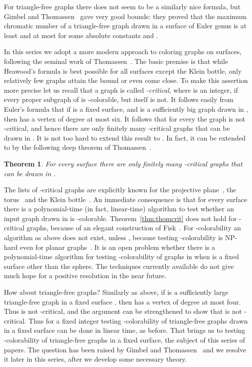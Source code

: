 \documentclass{article}
\def\rt#1{#1}
\def\mylabel#1{{\label{#1}}}
\newtheorem{theorem}{Theorem}
\begin{document}
For triangle-free graphs there does not seem to be a similarly nice formula,
but Gimbel and Thomassen~\cite{gimbel} gave very good bounds: they
proved that the maximum chromatic number of a triangle-free graph drawn
in a surface of Euler genus  is at least 
and at most  for some absolute constants 
 and .

In this series we adopt a more modern approach to coloring graphs on surfaces,
following the seminal work of 
Thomassen~\cite{Tho5torus,ThoCritical,thom-surf}.
The basic premise is that while Heawood's formula is best possible
for all surfaces except the Klein bottle, only relatively few graphs attain
the bound or even come close.
To make this assertion more precise let us recall that a graph  is
called {\em -critical}, where  is an integer, if every proper
subgraph of  is -colorable, but  itself is not.
It follows easily from Euler's formula that if  is a fixed surface,
and  is a sufficiently big graph drawn in , then  has 
a vertex of degree at most six. 
It follows that for every  the graph  is not -critical,
and hence there
are only finitely many -critical graphs that can be drawn in .
It is not too hard to extend this result to .
In fact, it can be extended to  by the following deep theorem
of Thomassen~\cite{ThoCritical}.

\begin{theorem}
\mylabel{thm:thomcrit}
For every surface  there are only finitely many -critical 
graphs that can be drawn in .
\end{theorem}

\noindent
The lists of -critical graphs are explicitly known for the
projective plane~\cite{AlbHut}, the torus~\cite{Tho5torus} and the 
Klein bottle~\cite{ChePosStrThoYer,KawKraKynLid}.
An immediate consequence is that for every surface  there is
a polynomial-time (in fact, linear-time) algorithm to test whether
an input graph drawn in  is -colorable.
Theorem~\ref{thm:thomcrit} does not hold for -critical graphs,
because of an elegant construction of Fisk~\cite{Fis}.
For -colorability an algorithm as above does not exist, unless ,
because testing -colorability is NP-hard even for planar 
graphs~\cite{GarJoh}.
It is an open problem whether there is a polynomial-time algorithm for testing
-colorability of graphs in  when  is a fixed
surface other than \rt{the} sphere.
The techniques currently available do not give much hope for a positive
resolution in the near future. 

How about triangle-free graphs?
Similarly as above, if  is a sufficiently large triangle-free graph
in a fixed surface , then  has a vertex of degree at most four.
Thus  is not -critical, and the argument can be strengthened to show
that  is not -critical.
Thus for a fixed integer  testing -colorability of triangle-free graphs
drawn in a fixed surface can be done in linear time, as before.
That brings us to testing -colorability of triangle-free graphs
in a fixed surface, the subject of this series of papers.
The question has been raised by
Gimbel and Thomassen~\cite{gimbel} and we resolve it later
in this series, after we develop some necessary theory.
\end{document}
